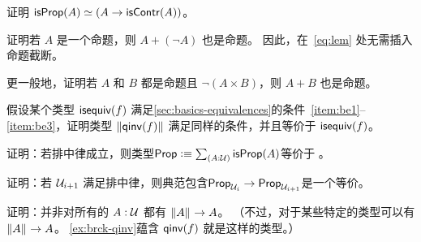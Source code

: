 \begin{ex}\label{ex:prop-inhabcontr}
  证明 $\mathsf{isProp}(A) \simeq (A\to\mathsf{isContr}(A))$。
\end{ex}

\begin{ex}\label{ex:lem-mereprop}
  证明若 $A$ 是一个命题，则 $A+(\neg A)$ 也是命题。
  因此，在~\eqref{eq:lem} 处无需插入命题截断。
\end{ex}

\begin{ex}\label{ex:disjoint-or}
  更一般地，证明若 $A$ 和 $B$ 都是命题且 $\neg(A\times B)$，则 $A+B$ 也是命题。
\end{ex}




\begin{ex}\label{ex:brck-qinv}
  假设某个类型 $\mathsf{isequiv}(f)$ 满足\cref{sec:basics-equivalences}的条件~\ref{item:be1}--\ref{item:be3}，证明类型 $\mathopen{}\left\Vert \mathsf{qinv}(f)\right\Vert_{}\mathclose{}$ 满足同样的条件，并且等价于 $\mathsf{isequiv}(f)$。
\end{ex}

\begin{ex}\label{ex:lem-impl-prop-equiv-bool}
  证明：若排中律成立，则类型$\prop \defeq \sm{A:\type} \isprop(A)$等价于 \bool。
\end{ex}

\begin{ex}\label{ex:lem-impred}
  证明：若 $\mathcal{U}_{i+1}$ 满足排中律，则典范包含$\mathsf{Prop}_{\mathcal{U}_i} \to \mathsf{Prop}_{\mathcal{U}_{i+1}}$是一个等价。
\end{ex}

\begin{ex}\label{ex:not-brck-A-impl-A}
  证明：并非对所有的 $A:\mathcal{U}$ 都有 $\mathopen{}\left\Vert A\right\Vert_{}\mathclose{} \to A$。
  （不过，对于某些特定的类型可以有 $\mathopen{}\left\Vert A\right\Vert_{}\mathclose{}\to A$。
  \cref{ex:brck-qinv}蕴含 $\mathsf{qinv}(f)$ 就是这样的类型。）
\end{ex}


